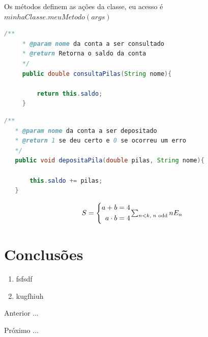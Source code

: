 \par Os métodos definem as ações da classe, eu acesso é $minhaClasse.meuMetodo(args)$

\begin{lstlisting}[language=Java, caption=consultaPilas, label=consultaPilas]
    /**
     * @param nome da conta a ser consultado
     * @return Retorna o saldo da conta
     */
     public double consultaPilas(String nome){

         return this.saldo;
     }

\end{lstlisting}

\begin{lstlisting}[language=Java, caption=depositoPilas, label=depositaPilas]
    /**
   * @param nome da conta a ser depositado
   * @return 1 se deu certo e 0 se ocorreu um erro
   */
   public void depositaPila(double pilas, String nome){

       this.saldo += pilas;
   }
\end{lstlisting}








\begin{equation}
S = \left\{
\begin{aligned}
  a + b     &= 4\\
  a \cdot b &= 4
\end{aligned}
\right.
$$ $$%
\sum_{n<k,\;\text{$n$ odd}} nE_n
 \label{1}
\end{equation}


\section{Conclusões}


\begin{enumerate}[label=\Roman{*}, ref=(\roman{*})]
  \item fsfsdf
  \item kugfhiuh
\end{enumerate}

\begin{asparaenum}
\item Anterior ... \cite{ninguem2022curioso}
\item Próximo ... \label{pl1}
\end{asparaenum}









